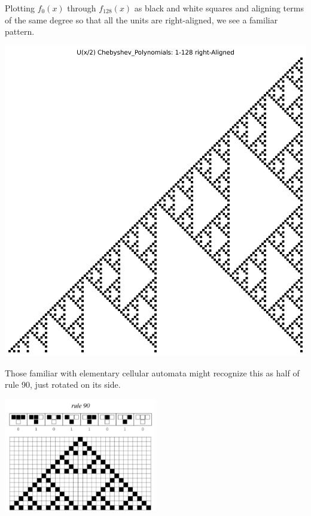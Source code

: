 \documentclass[a4paper]{article}
\begin{document}
	Plotting $f_0(x)$ through $f_{128}(x)$ as black and white squares and aligning terms of the same degree so that all the units are right-aligned, we see a familiar pattern.
	\begin{center}
		\includegraphics[width=.5\textwidth]{../../code/serialization/chebyshev/chebyshev1_right_128.png}	
	\end{center}

	Those familiar with elementary cellular automata might recognize this as half of rule 90, just rotated on its side.
	\begin{center}
		\includegraphics[width=0.5\textwidth]{rule90.png}
	\end{center}
\end{document}
